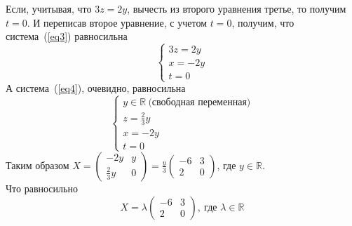 \documentclass{article}
\begin{document}
Если, учитывая, что  $3z=2y$, вычесть из второго уравнения третье, то получим $t=0$. И переписав второе уравнение, с учетом $t=0$, получим, что система~(\ref{eq3}) равносильна
\begin{equation}
\label{eq4}
    \begin{cases}3z=2y\\x=-2y\\t=0\end{cases}
\end{equation}
А система~(\ref{eq4}), очевидно, равносильна
$$\begin{cases}y\in \mathbb{R}\ \textrm{(свободная переменная)}\\z=\frac{2}{3}y\\x=-2y\\t=0\end{cases}$$
Таким образом $X=\left(\begin{array}{rr}-2y & y\\\frac{2}{3}y & 0\end{array}\right)=\frac{y}{3}\left(\begin{array}{rr}-6 & 3\\2 & 0\end{array}\right)$, где $y\in\mathbb{R}$.
\\
Что равносильно
$$X=\lambda\left(\begin{array}{rr}-6 & 3\\2 & 0\end{array}\right),\ \textrm{где }\lambda\in\mathbb{R}$$
\end{document}
